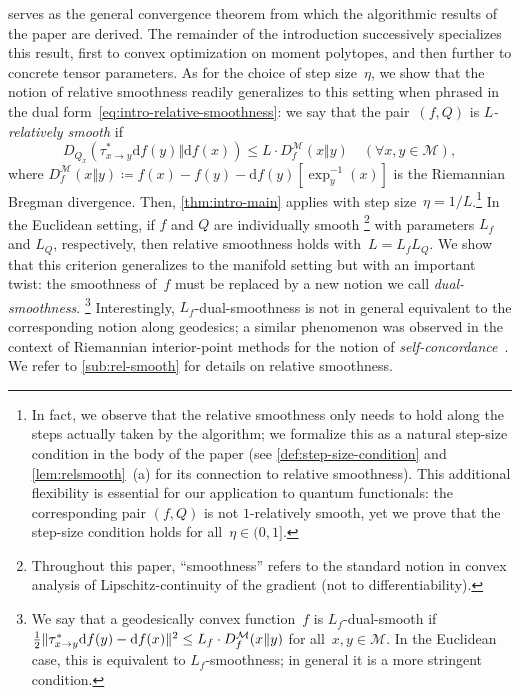 \documentclass[11pt,letterpaper]{article}
\numberwithin{equation}{section}
\newcommand{\diff}{\mathrm{d}}
\newcommand{\MM}{\mathcal{M}}
\DeclarePairedDelimiter\norm{\lVert}{\rVert}
\begin{document}
 serves as the general convergence theorem from which the algorithmic results of the paper are derived.
The remainder of the introduction successively specializes this result, first to convex optimization on moment polytopes, and then further to concrete tensor parameters.
As for the choice of step size~$\eta$, we show that the notion of relative smoothness readily generalizes to this setting when phrased in the dual form~\eqref{eq:intro-relative-smoothness}:
we say that the pair~$(f, Q)$ is \emph{$L$-relatively smooth} if
\begin{equation}
\label{eq:rel-smoothness-ineq}
    D_{Q_x}(\tau_{x\to y}^*\diff f(y)\Vert \diff f(x)) \leq L \cdot D_f^{\MM}(x\Vert y) \quad (\forall x, y \in \MM),
\end{equation}
where $D_f^{\MM}(x\Vert y)\coloneqq f(x)-f(y)-\diff f(y) [ \exp^{-1}_y(x) ]$ is the Riemannian Bregman divergence.
Then, \cref{thm:intro-main} applies with step size~$\eta = 1/L$.\footnote{In fact, we observe that the relative smoothness only needs to hold along the steps actually taken by the algorithm; we formalize this as a natural step-size condition in the body of the paper (see \cref{def:step-size-condition} and \cref{lem:relsmooth}~(a) for its connection to relative smoothness).
This additional flexibility is essential for our application to quantum functionals: the corresponding pair $(f,Q)$ is not $1$-relatively smooth, yet we prove that the step-size condition holds for all~$\eta\in(0,1]$. }
In the Euclidean setting, if $f$ and $Q$ are individually smooth%
\footnote{Throughout this paper, ``smoothness'' refers to the standard notion in convex analysis of Lipschitz-continuity of the gradient (not to differentiability).}
with parameters $L_f$ and $L_Q$, respectively, then relative smoothness holds with~$L=L_f L_Q$.
We show that this criterion generalizes to the manifold setting but with an important twist: the smoothness of~$f$ must be replaced by a new notion we call \emph{dual-smoothness}.%
\footnote{We say that a geodesically convex function~$f$ is $L_f$-dual-smooth if $\frac12 \norm{ \tau^{\ast}_{x \to y}\diff f(y) - \diff f(x) }^2 \leq L_f \cdot D_f^\MM(x\Vert y)$ for all~$x,y\in\MM$.
In the Euclidean case, this is equivalent to $L_f$-smoothness; in general it is a more stringent condition.}
Interestingly, $L_f$-dual-smoothness is not in general equivalent to the corresponding notion along geodesics; a similar phenomenon was observed in the context of Riemannian interior-point methods for the notion of \emph{self-concordance}~\cite{HNW2023}.
We refer to \cref{sub:rel-smooth} for details on relative smoothness.
\end{document}
